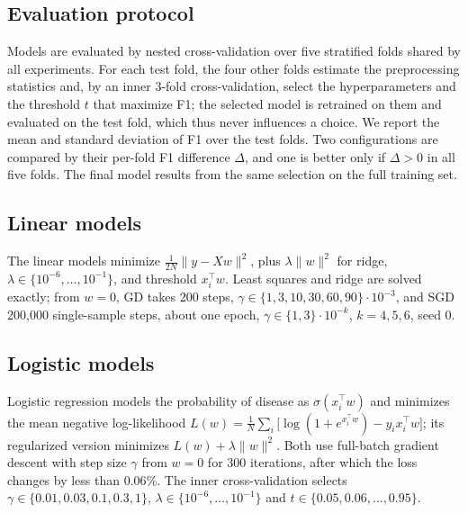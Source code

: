 \documentclass[10pt,conference,compsocconf]{IEEEtran}
\begin{document}
\subsection{Evaluation protocol}\label{sec:protocol}
Models are evaluated by nested cross-validation over five stratified folds
shared by all experiments. For each test fold, the four other folds
estimate the preprocessing statistics and, by an inner 3-fold
cross-validation, select the hyperparameters and the threshold $t$ that
maximize F1; the selected model is retrained on them and evaluated on the
test fold, which thus never influences a choice. We report the mean and standard deviation of F1 over the test
folds. Two configurations are compared by their per-fold F1 difference
$\Delta$, and one is better only if $\Delta>0$ in all five folds. The
final model results from the same selection on the full training set.

\subsection{Linear models}
The linear models minimize $\frac1{2N}\|y-Xw\|^2$, plus $\lambda\|w\|^2$
for ridge, $\lambda\in\{10^{-6},\dots,10^{-1}\}$, and threshold $x_i^\top w$.
Least squares and ridge are solved exactly; from $w=0$, GD takes 200 steps,
$\gamma\in\{1,3,10,30,60,90\}\cdot10^{-3}$, and SGD 200{,}000
single-sample steps, about one epoch, $\gamma\in\{1,3\}\cdot10^{-k}$,
$k=4,5,6$, seed 0.

\subsection{Logistic models}
Logistic regression models the probability of disease as
$\sigma(x_i^\top w)$ and minimizes the mean negative
log-likelihood
$L(w)=\frac1N\sum_i\bigl[\log(1+e^{x_i^\top w})-y_i x_i^\top w\bigr]$; its
regularized version minimizes $L(w)+\lambda\|w\|^2$. Both use full-batch
gradient descent with step size $\gamma$ from $w=0$ for 300 iterations,
after which the loss changes by less than $0.06\%$. The inner
cross-validation selects $\gamma\in\{0.01,0.03,0.1,0.3,1\}$,
$\lambda\in\{10^{-6},\dots,10^{-1}\}$ and $t\in\{0.05,0.06,\dots,0.95\}$.
\end{document}
